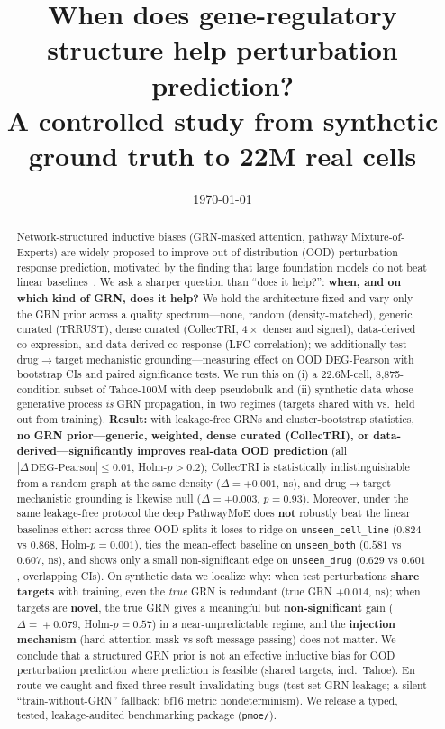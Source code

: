 \documentclass[11pt]{article}
\title{When does gene-regulatory structure help perturbation prediction?\\
A controlled study from synthetic ground truth to 22M real cells}
\author{\todo{Authors / affiliations}}
\date{\today}
\begin{document}
\maketitle

\begin{abstract}
Network-structured inductive biases (GRN-masked attention, pathway Mixture-of-Experts) are widely
proposed to improve out-of-distribution (OOD) perturbation-response prediction, motivated by the
finding that large foundation models do not beat linear baselines~\cite{nm2025benchmark}. We ask a
sharper question than ``does it help?'': \textbf{when, and on which kind of GRN, does it help?} We hold
the architecture fixed and vary only the GRN prior across a quality spectrum---none, random
(density-matched), generic curated (TRRUST), dense curated (CollecTRI, $4\times$ denser and signed),
data-derived co-expression, and data-derived co-response (LFC correlation); we additionally test
drug$\rightarrow$target mechanistic grounding---measuring effect on OOD DEG-Pearson with bootstrap CIs and paired significance
tests. We run this on (i) a 22.6M-cell, 8{,}875-condition subset of Tahoe-100M with deep pseudobulk and
(ii) synthetic data whose generative process \emph{is} GRN propagation, in two regimes (targets shared
with vs.\ held out from training). \textbf{Result:} with leakage-free GRNs and cluster-bootstrap
statistics, \textbf{no GRN prior---generic, weighted, dense curated (CollecTRI), or data-derived---significantly
improves real-data OOD prediction} (all $|\Delta\,\text{DEG-Pearson}|\le 0.01$, Holm-$p>0.2$); CollecTRI
is statistically indistinguishable from a random graph at the same density ($\Delta=+0.001$, ns), and
drug$\rightarrow$target mechanistic grounding is likewise null ($\Delta=+0.003$, $p=0.93$). Moreover, under the same
leakage-free protocol the deep PathwayMoE does \textbf{not} robustly beat the linear baselines either:
across three OOD splits it loses to ridge on \texttt{unseen\_cell\_line} ($0.824$ vs $0.868$, Holm-$p\!=\!0.001$),
ties the mean-effect baseline on \texttt{unseen\_both} ($0.581$ vs $0.607$, ns), and shows only a small
non-significant edge on \texttt{unseen\_drug} ($0.629$ vs $0.601$, overlapping CIs). On synthetic data
we localize why: when test perturbations \textbf{share targets} with training, even the \emph{true} GRN
is redundant (true GRN $+0.014$, ns); when targets are \textbf{novel}, the true GRN gives a
meaningful but \textbf{non-significant} gain ($\Delta\!=\!+0.079$, Holm-$p\!=\!0.57$) in a
near-unpredictable regime, and the \textbf{injection mechanism} (hard attention mask vs soft
message-passing) does not matter. We
conclude that a structured GRN prior is not an effective inductive bias for OOD perturbation prediction
where prediction is feasible (shared targets, incl.\ Tahoe). En route we caught and fixed three
result-invalidating bugs (test-set GRN leakage; a silent ``train-without-GRN'' fallback; bf16 metric
nondeterminism). We release a typed, tested, leakage-audited benchmarking package (\texttt{pmoe/}).
\end{abstract}
\end{document}

